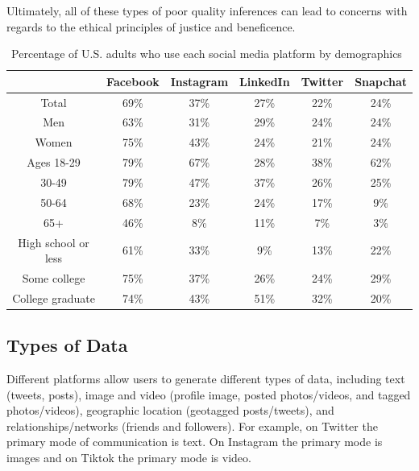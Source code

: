 \documentclass[11pt]{article} %
\begin{document}
Ultimately, all of these types of poor quality inferences can lead to concerns with regards to the ethical principles of justice and beneficence. 

\begin{table}[h]
\small
\centering
\caption{Percentage of U.S. adults who use each social media platform by demographics~\cite{sm_demo} }
\label{table:platform-demographics}
\begin{tabular}{cccccc}
\toprule
                      & Facebook & Instagram & LinkedIn & Twitter & Snapchat \\ \midrule
Total                 & 69\%     & 37\%      & 27\%     & 22\%    & 24\%     \\ \midrule
Men                   & 63\%     & 31\%      & 29\%     & 24\%    & 24\% \\ 
Women                 & 75\%     & 43\%      & 24\%     & 21\%    & 24\% \\ \midrule
Ages 18-29          & 79\%     & 67\%      & 28\%     & 38\%    & 62\% \\ 
30-49                 & 79\%     & 47\%      & 37\%     & 26\%    & 25\% \\ 
50-64                 & 68\%     & 23\%      & 24\%     & 17\%    & 9\% \\ 
65+                   & 46\%     & 8\%       & 11\%     & 7\%     & 3\% \\ \midrule
High school or less & 61\%     & 33\%      & 9\%      & 13\%    & 22\%       \\ 
Some college        & 75\%     & 37\%      & 26\%     & 24\%    & 29\%       \\ 
College graduate    & 74\%     & 43\%      & 51\%     & 32\%    & 20\%       \\ \bottomrule
\end{tabular}
\end{table}





\subsection{Types of Data}
Different platforms allow users to generate different types of data, including text (tweets, posts), image and video (profile image, posted photos/videos, and tagged photos/videos), geographic location (geotagged posts/tweets), and relationships/networks (friends and followers). For example, on Twitter the primary mode of communication is text. On Instagram the primary mode is images and on Tiktok the primary mode is video. 
\end{document}
